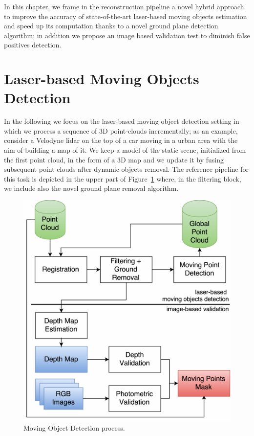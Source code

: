 In this chapter, we frame in the reconstruction pipeline a novel hybrid approach to improve the accuracy of state-of-the-art laser-based moving objects estimation and speed up its computation thanks to a novel ground plane detection algorithm; in addition we propose an image based validation test to diminish false positives detection. 



\section{Laser-based Moving Objects Detection}%
\label{sec:lidar}
In the following we focus on the laser-based moving object detection setting in which we process a sequence of 3D point-clouds incrementally; as an example, consider a Velodyne lidar on the top of a car moving in a urban area with the aim of building a map of it. 
We keep a model of the static scene, initialized from the first point cloud, in the form of a 3D map and we update it by fusing subsequent point clouds after dynamic objects removal. 
The reference pipeline for this task is depicted in the upper part of Figure~\ref{fig:algo} where, in the filtering block, we include also the novel ground plane removal algorithm.

\begin{figure}[t]
\centering
\includegraphics[width=0.98\columnwidth]{./img/ch-laser/MovingPointDetection}
\caption{Moving Object Detection process.}
\label{fig:algo}
\end{figure}
%
